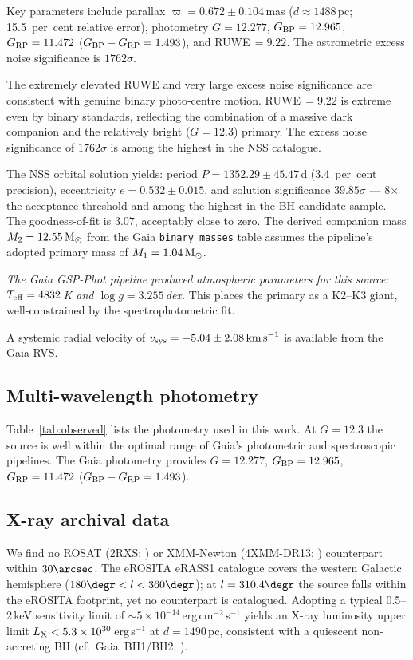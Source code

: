\documentclass[usenatbib,fleqn]{mnras}
\newcommand{\Msun}{{\rm M}_\odot}
\newcommand{\kms}{{\rm km\,s}^{-1}}
\begin{document}
Key parameters include parallax
$\varpi = 0.672 \pm 0.104$\,mas
($d \approx 1488$\,pc; 15.5~per~cent relative error), photometry
$G = 12.277$, $G_{\rm BP} = 12.965$, $G_{\rm RP} = 11.472$
($G_{\rm BP} - G_{\rm RP} = 1.493$), and RUWE$\,= 9.22$.
The astrometric excess noise significance is $1762\sigma$.

The extremely elevated RUWE and very large excess noise significance
are consistent with genuine binary photo-centre motion.
RUWE$\,= 9.22$ is extreme even by binary standards, reflecting
the combination of a massive dark companion and the relatively
bright ($G = 12.3$) primary.  The excess noise significance of
$1762\sigma$ is among the highest in the NSS catalogue.

The NSS orbital solution yields:
period $P = 1352.29 \pm 45.47$\,d (3.4~per~cent precision),
eccentricity $e = 0.532 \pm 0.015$, and solution significance
$39.85\sigma$ --- 8$\times$ the acceptance threshold and among the
highest in the BH candidate sample.  The goodness-of-fit is $3.07$,
acceptably close to zero.  The derived companion mass
$M_2 = 12.55\,\Msun$ from the Gaia \texttt{binary\_masses} table
assumes the pipeline's adopted primary mass of
$M_1 = 1.04\,\Msun$.

\emph{The Gaia GSP-Phot pipeline produced atmospheric parameters
for this source: $T_{\rm eff} = 4832$\,K and
$\log g = 3.255$\,dex.}  This places the primary as a K2--K3
giant, well-constrained by the spectrophotometric fit.

A systemic radial velocity of
$v_{\rm sys} = -5.04 \pm 2.08\,\kms$ is available from the
Gaia RVS.

\subsection{Multi-wavelength photometry}
\label{sec:data:phot}

Table~\ref{tab:observed} lists the photometry used in this work.
At $G = 12.3$ the source is well within the optimal range of
Gaia's photometric and spectroscopic pipelines.  The Gaia
photometry provides $G = 12.277$, $G_{\rm BP} = 12.965$,
$G_{\rm RP} = 11.472$ ($G_{\rm BP} - G_{\rm RP} = 1.493$).

\subsection{X-ray archival data}
\label{sec:data:xray}

We find no ROSAT (2RXS; \citealt{Boller2016}) or XMM-Newton
(4XMM-DR13; \citealt{Webb2020}) counterpart within $30\arcsec$.
The eROSITA eRASS1 catalogue \citep{Merloni2024} covers the
western Galactic hemisphere ($180\degr < l < 360\degr$); at
$l = 310.4\degr$ the source falls within the eROSITA footprint,
yet no counterpart is catalogued.  Adopting a typical 0.5--2\,keV
sensitivity limit of $\sim 5 \times 10^{-14}$\,erg\,cm$^{-2}$\,s$^{-1}$
yields an X-ray luminosity upper limit
$L_{\rm X} < 5.3 \times 10^{30}$\,erg\,s$^{-1}$ at $d = 1490$\,pc,
consistent with a quiescent non-accreting BH (cf.\
Gaia~BH1/BH2; \citealt{ElBadry2023a, ElBadry2023b}).
\end{document}
